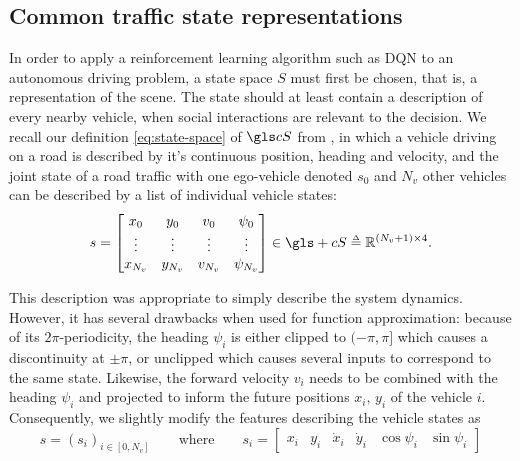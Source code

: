 \subsection{Common traffic state representations}

In order to apply a reinforcement learning algorithm such as \gls{DQN} to an autonomous driving problem, a state space $S$ must first be chosen, that is, a representation of the scene. The state should at least contain a description of every nearby vehicle, when social interactions are relevant to the decision. We recall our definition \eqref{eq:state-space} of $\cS$ from , in which a vehicle driving on a road is described by it's continuous position, heading and velocity, and the joint state of a road traffic with one ego-vehicle denoted $s_0$ and $N_v$ other vehicles can be described by a list of individual vehicle states:
\begin{equation*}
s = \begin{bmatrix}
x_0 & y_0 & v_0 & \psi_0\\
\vdots & \vdots & \vdots & \vdots\\
x_{N_v} & y_{N_v} & v_{N_v} & \psi_{N_v}\\
\end{bmatrix}
\in\gls+{cS} \eqdef\Real^{(N_v+1) \times 4}.
\end{equation*}

This description was appropriate to simply describe the system dynamics. However, it has several drawbacks when used for function approximation: because of its $2\pi$-periodicity, the heading $\psi_i$ is either clipped to $(-\pi, \pi]$ which causes a discontinuity at $\pm\pi$, or unclipped which causes several inputs to correspond to the same state. Likewise, the forward velocity $v_i$ needs to be combined with the heading $\psi_i$ and projected to inform the future positions $x_i,\,y_i$ of the vehicle $i$. Consequently, we slightly modify the features describing the vehicle states as
\begin{equation}
s = \left(s_i \right)_{i \in [0, N_v]}\qquad
\text{where}\qquad
s_i = \begin{bmatrix}
x_i & y_i & \dot{x}_i & \dot{y}_i & \cos\psi_i & \sin \psi_i
\end{bmatrix}
\label{eq:coordinates}
\end{equation}


